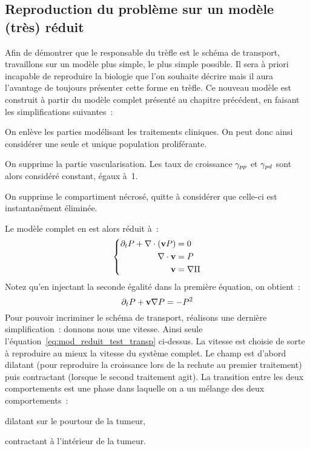 \documentclass[main.tex]{subfiles}
\begin{document}
\subsection{Reproduction du problème sur un modèle (très) réduit}
Afin de démontrer que le responsable du trèfle est le schéma de transport, travaillons sur un modèle plus simple, le plus simple possible. Il sera à priori incapable de reproduire la biologie que l'on souhaite décrire mais il aura l'avantage de toujours présenter cette forme en trèfle. 
Ce nouveau modèle est construit à partir du modèle complet présenté au chapitre précédent, en faisant les simplifications suivantes~:
\begin{myitemize}
\item On enlève les parties modélisant les traitements cliniques. On peut donc ainsi considérer une seule et unique population proliférante.
\item On supprime la partie vascularisation. Les taux de croissance $\gamma_{pp}$ et $\gamma_{pd}$ sont alors considéré constant, égaux à~1.
\item On supprime le compartiment nécrosé, quitte à considérer que celle-ci est instantanément éliminée.
\end{myitemize}
Le modèle complet en est alors réduit à~:
\begin{equation}
\left\{ \begin{aligned}
\partial_t P + \nabla\cdot (\mathbf{v} P) &= 0 \\
\nabla\cdot \mathbf{v} &= P  \\
\mathbf{v} &= \nabla \Pi
\end{aligned} \right.
\end{equation}
Notez qu'en injectant la seconde égalité dans la première équation, on obtient~:
\begin{equation}\label{eq:mod_reduit_test_transp}
\partial_t P + \mathbf{v} \nabla P = -P^2
\end{equation}
Pour pouvoir incriminer le schéma de transport, réalisons une dernière simplification~: donnons nous une vitesse. Ainsi seule l'équation~\ref{eq:mod_reduit_test_transp} ci-dessus. La vitesse est choisie de sorte à reproduire au mieux la vitesse du système complet. Le champ est d'abord dilatant (pour reproduire la croissance lors de la rechute au premier traitement) puis contractant (lorsque le second traitement agit). La transition entre les deux comportements est une phase dans laquelle on a un mélange des deux comportements~:
\begin{myitemize}
\item dilatant sur le pourtour de la tumeur,
\item contractant à l'intérieur de la tumeur.
\end{myitemize}
\end{document}
